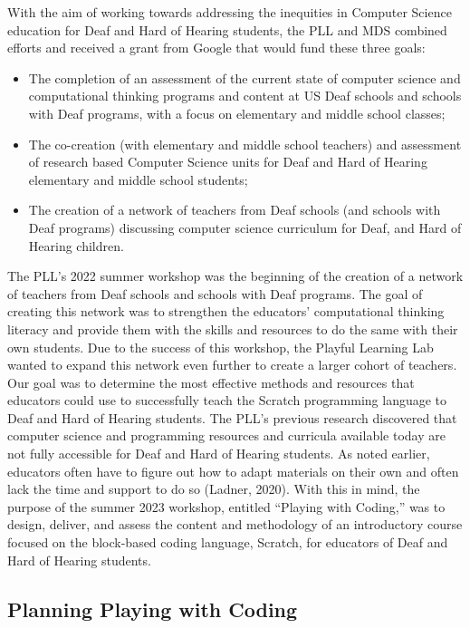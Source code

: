 \documentclass[11.5pt]{sig-alternate} %
\begin{document}
\begin{large}
With the aim of working towards addressing the inequities in Computer Science education for Deaf and Hard of Hearing students, the PLL and MDS combined efforts and received a grant from Google that would fund these three goals:

\begin{itemize}[parsep=4em]
    \item The completion of an assessment of the current state of computer science and computational thinking programs and content at US Deaf schools and schools with Deaf programs, with a focus on elementary and middle school classes; 
    \item The co-creation (with elementary and middle school teachers) and assessment of research based Computer Science units for Deaf and Hard of Hearing elementary and middle school students;
    \item The creation of a network of teachers from Deaf schools (and schools with Deaf programs) discussing computer science curriculum for Deaf, and Hard of Hearing children.
\end{itemize}

The PLL’s 2022 summer workshop was the beginning of the creation of a network of teachers from Deaf schools and schools with Deaf programs. The goal of creating this network was to strengthen the educators’ computational thinking literacy and provide them with the skills and resources to do the same with their own  students. Due to the success of this workshop, the Playful Learning Lab wanted to expand this network even further to create a larger cohort of teachers. Our goal was to determine the most effective methods and resources that educators could use to successfully teach the Scratch programming language to Deaf and Hard of Hearing students. The PLL’s previous research discovered that computer science and programming resources and curricula available today are not fully accessible for Deaf and Hard of Hearing students. As noted earlier, educators often have to figure out how to adapt materials on their own and often lack the time and support to do so (Ladner, 2020). With this in mind, the purpose of the summer 2023 workshop, entitled “Playing with Coding,” was to design, deliver, and assess the content and methodology of an introductory course focused on the block-based coding language, Scratch, for educators of Deaf and Hard of Hearing students. 

\subsection*{Planning Playing with Coding}


\end{large}
\end{document}
